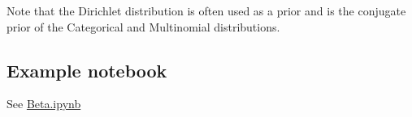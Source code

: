 \documentclass{article}
\begin{document}
\noindent Note that the Dirichlet distribution is often used as a prior and is the conjugate prior of the Categorical and Multinomial distributions.

\subsection{Example notebook}
See \href{https://github.com/harvard-ml-courses/cs281-demos/blob/master/Beta.ipynb}{Beta.ipynb}
\end{document}
